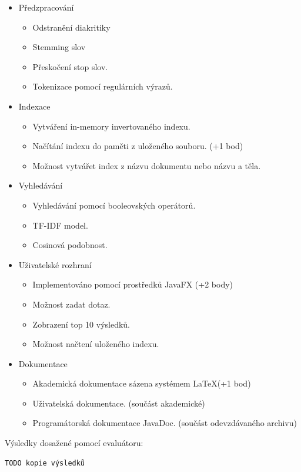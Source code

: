 \documentclass[12pt, a4paper]{article}
\begin{document}
\begin{itemize}
\item Předzpracování
	\begin{itemize}
		\item Odstranění diakritiky
		\item Stemming slov
		\item Přeskočení stop slov.
		\item Tokenizace pomocí regulárních výrazů.
	\end{itemize}
\item{Indexace}
		\begin{itemize}
		\item Vytváření in-memory invertovaného indexu.
		\item Načítání indexu do paměti z uloženého souboru. (+1 bod)
		\item Možnost vytvářet index z názvu dokumentu nebo názvu a těla.
	\end{itemize}
\item{Vyhledávání}
	\begin{itemize}
		\item Vyhledávání pomocí booleovských operátorů.
		\item TF-IDF model.
		\item Cosinová podobnost.
	\end{itemize}
\item{Uživatelské rozhraní}
	\begin{itemize}
		\item Implementováno pomocí prostředků JavaFX (+2 body)
		\item Možnost zadat dotaz.
		\item Zobrazení top 10 výsledků.
		\item Možnost načtení uloženého indexu.
	\end{itemize}
\item{Dokumentace}
	\begin{itemize}
		\item Akademická dokumentace sázena systémem \LaTeX (+1 bod)
		\item Uživatelská dokumentace. (součást akademické)
		\item Programátorská dokumentace JavaDoc. (součást odevzdávaného archivu) 
	\end{itemize}	
\end{itemize}

Výsledky dosažené pomocí evaluátoru:

\begin{verbatim}
TODO kopie výsledků
\end{verbatim}
\end{document}
